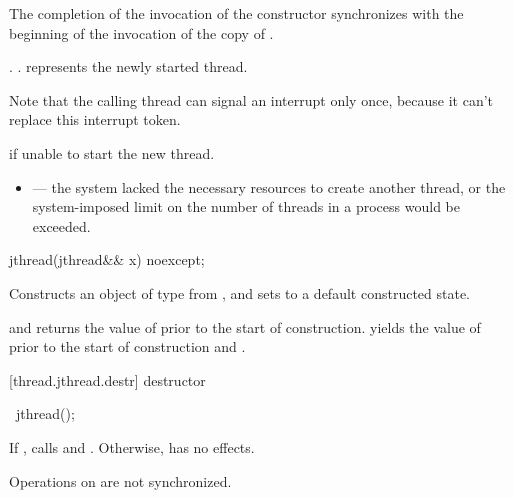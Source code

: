 \begin{itemdescr}
\pnum\sync The completion of the invocation of the constructor
synchronizes with the beginning of the invocation of the copy of .

{\color{diffcolor}
\pnum\postconditions {}.
                     .
                      represents the newly started thread.
\begin{note} Note that the calling thread can signal an interrupt only once,
                because it can't replace this interrupt token.  \end{note}
}%

\pnum\throws {} if unable to start the new thread.

\pnum\errors
\begin{itemize}
\item {} --- the system lacked the necessary
resources to create another thread, or the system-imposed limit on the number of
threads in a process would be exceeded.
\end{itemize}
\end{itemdescr}

%
\begin{itemdecl}
jthread(jthread&& x) noexcept;
\end{itemdecl}

\begin{itemdescr}
\pnum
\effects Constructs an object of type  from , and sets
 to a default constructed state.

\pnum
\postconditions {} and  returns the
value of  prior to the start of construction.
{\color{diffcolor}
 yields the value of  prior to the start of construction
and .
}%

\end{itemdescr}

[thread.jthread.destr]{ destructor}

%
\begin{itemdecl}
~jthread();
\end{itemdecl}

{\color{diffcolor}
\begin{itemdescr}
\pnum
If , calls  and .
Otherwise, has no effects.
\begin{note} Operations on  are not synchronized. \end{note}
\end{itemdescr}
}%

